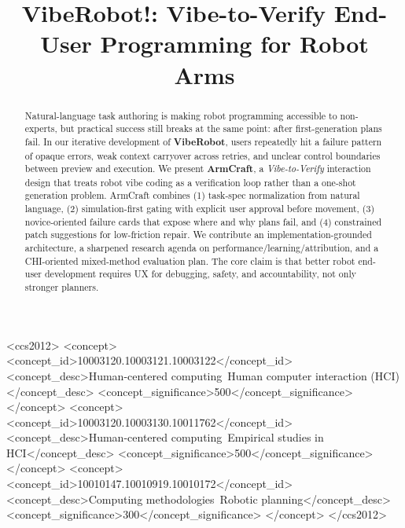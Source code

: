 \documentclass[sigconf,review,anonymous]{acmart}
\begin{document}
\title{VibeRobot!: Vibe-to-Verify End-User Programming for Robot Arms}

\begin{abstract}
Natural-language task authoring is making robot programming accessible to non-experts, but practical success still breaks at the same point: after first-generation plans fail. In our iterative development of \textbf{VibeRobot}, users repeatedly hit a failure pattern of opaque errors, weak context carryover across retries, and unclear control boundaries between preview and execution. We present \textbf{ArmCraft}, a \emph{Vibe-to-Verify} interaction design that treats robot vibe coding as a verification loop rather than a one-shot generation problem. ArmCraft combines (1) task-spec normalization from natural language, (2) simulation-first gating with explicit user approval before movement, (3) novice-oriented failure cards that expose where and why plans fail, and (4) constrained patch suggestions for low-friction repair. We contribute an implementation-grounded architecture, a sharpened research agenda on performance/learning/attribution, and a CHI-oriented mixed-method evaluation plan. The core claim is that better robot end-user development requires UX for debugging, safety, and accountability, not only stronger planners.
\end{abstract}

\begin{CCSXML}
<ccs2012>
<concept>
<concept_id>10003120.10003121.10003122</concept_id>
<concept_desc>Human-centered computing~Human computer interaction (HCI)</concept_desc>
<concept_significance>500</concept_significance>
</concept>
<concept>
<concept_id>10003120.10003130.10011762</concept_id>
<concept_desc>Human-centered computing~Empirical studies in HCI</concept_desc>
<concept_significance>500</concept_significance>
</concept>
<concept>
<concept_id>10010147.10010919.10010172</concept_id>
<concept_desc>Computing methodologies~Robotic planning</concept_desc>
<concept_significance>300</concept_significance>
</concept>
</ccs2012>
\end{CCSXML}


\end{document}
